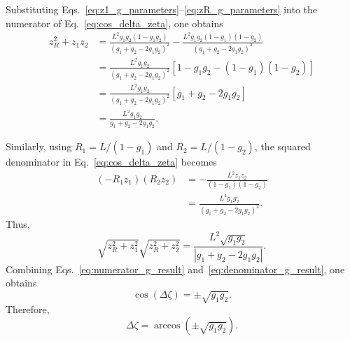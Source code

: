 \begin{resolucao}[Solution]
        Substituting Eqs.~\eqref{eq:z1_g_parameters}--\eqref{eq:zR_g_parameters} into the numerator of Eq.~\eqref{eq:cos_delta_zeta}, one obtains
        \begin{align}
            z_R^2+z_1z_2
            &=
            \frac{
                L^2g_1g_2(1-g_1g_2)
            }{
                \left(
                    g_1+g_2-2g_1g_2
                \right)^2
            }
            -
            \frac{
                L^2g_1g_2(1-g_1)(1-g_2)
            }{
                \left(
                    g_1+g_2-2g_1g_2
                \right)^2
            }
            \nonumber\\
            &=
            \frac{
                L^2g_1g_2
            }{
                \left(
                    g_1+g_2-2g_1g_2
                \right)^2
            }
            \left[
                1-g_1g_2
                -
                (1-g_1)(1-g_2)
            \right]
            \nonumber\\
            &=
            \frac{
                L^2g_1g_2
            }{
                \left(
                    g_1+g_2-2g_1g_2
                \right)^2
            }
            \left[
                g_1+g_2-2g_1g_2
            \right]
            \nonumber\\
            &=
            \frac{
                L^2g_1g_2
            }{
                g_1+g_2-2g_1g_2
            }.
            \label{eq:numerator_g_result}
        \end{align}

        Similarly, using $R_1=L/(1-g_1)$ and $R_2=L/(1-g_2)$, the squared denominator in Eq.~\eqref{eq:cos_delta_zeta} becomes
        \begin{align}
            (-R_1z_1)(R_2z_2)
            &=
            -\frac{L^2z_1z_2}{(1-g_1)(1-g_2)}
            \nonumber\\
            &=
            \frac{
                L^4g_1g_2
            }{
                \left(
                    g_1+g_2-2g_1g_2
                \right)^2
            }.
            \label{eq:denominator_squared_g_result}
        \end{align}
        Thus,
        \begin{equation}
            \sqrt{z_R^2+z_1^2}
            \sqrt{z_R^2+z_2^2}
            =
            \frac{
                L^2\sqrt{g_1g_2}
            }{
                \left|
                g_1+g_2-2g_1g_2
                \right|
            }.
            \label{eq:denominator_g_result}
        \end{equation}
        Combining Eqs.~\eqref{eq:numerator_g_result} and~\eqref{eq:denominator_g_result}, one obtains
        \begin{equation}
            \cos(\Delta\zeta)
            =
            \pm\sqrt{g_1g_2}.
            \label{eq:cos_delta_zeta_g}
        \end{equation}
        Therefore,
        \begin{equation}
            \Delta\zeta
            =
            \arccos\left(
                \pm\sqrt{g_1g_2}
            \right).
            \label{eq:delta_zeta_final}
        \end{equation}


\end{resolucao}
